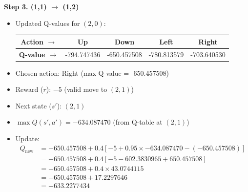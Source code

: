 \documentclass{article}
\begin{document}
\begin{itemize}
\noindent\textbf{Step 3. (1,1) \(\rightarrow\) (1,2)}
\begin{itemize}
    \item Updated Q-values for \((2,0)\):
    \begin{tabular}{|c|c|c|c|c|}
        \textbf{Action $\rightarrow$ } & Up & Down & Left & Right \\
        \hline
        \textbf{Q-value $\rightarrow$ } & -794.747436 & -650.457508 & -780.813579 & -703.640530\\
    \end{tabular}
    \vspace{10pt}
    \item Chosen action: Right (max Q-value = -650.457508)
    \item Reward (\(r\)): \(-5\) (valid move to \((2,1)\))
    \item Next state (\(s'\)): \((2,1)\)
    \item \(\max Q(s', a') = -634.087470\) (from Q-table at \((2,1)\))
    \item Update:
    \begin{align*}
        Q_{\text{new}} &= -650.457508 + 0.4 \left[ -5 + 0.95 \times -634.087470 - (-650.457508) \right] \\
        &= -650.457508 + 0.4 \left[ -5 - 602.3830965 + 650.457508 \right] \\
        &= -650.457508 + 0.4 \times 43.0744115 \\
        &= -650.457508 + 17.2297646 \\
        &= -633.2277434
    \end{align*}
\end{itemize}


\end{itemize}
\end{document}
